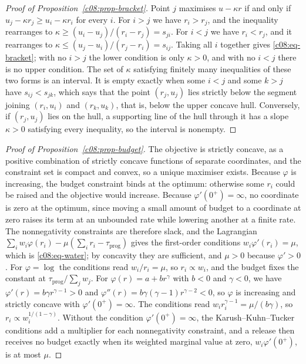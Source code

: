 \begin{proof}[Proof of Proposition~\ref{c08:prop-bracket}]
Point $j$ maximises $u - \kappa r$ if and only if $u_j - \kappa r_j \ge u_i -
\kappa r_i$ for every $i$. For $i > j$ we have $r_i > r_j$, and the inequality
rearranges to $\kappa \ge (u_i - u_j)/(r_i - r_j) = s_{ji}$. For $i < j$ we have
$r_i < r_j$, and it rearranges to $\kappa \le (u_j - u_i)/(r_j - r_i) = s_{ij}$.
Taking all $i$ together gives \eqref{c08:eq-bracket}; with no $i > j$ the lower
condition is only $\kappa > 0$, and with no $i < j$ there is no upper condition. The
set of $\kappa$ satisfying finitely many inequalities of these two forms is an
interval. It is empty exactly when some $i < j$ and some $k > j$ have
$s_{ij} < s_{jk}$, which says that the point $(r_j, u_j)$ lies strictly below the
segment joining $(r_i, u_i)$ and $(r_k, u_k)$, that is, below the upper concave hull.
Conversely, if $(r_j,u_j)$ lies on the hull, a supporting line of the hull through
it has a slope $\kappa > 0$ satisfying every inequality, so the interval is
nonempty.
\end{proof}

\begin{proof}[Proof of Proposition~\ref{c08:prop-budget}]
The objective is strictly concave, as a positive combination of strictly concave
functions of separate coordinates, and the constraint set is compact and convex, so
a unique maximiser exists. Because $\varphi$ is increasing, the budget constraint
binds at the optimum: otherwise some $r_i$ could be raised and the objective would
increase. Because $\varphi'(0^+) = \infty$, no coordinate is zero at the optimum,
since moving a small amount of budget to a coordinate at zero raises its term at an
unbounded rate while lowering another at a finite rate. The nonnegativity
constraints are therefore slack, and the Lagrangian
$\sum_i w_i\varphi(r_i) - \mu(\sum_i r_i - \tau_{\mathrm{prog}})$ gives the
first-order conditions $w_i\varphi'(r_i) = \mu$, which is \eqref{c08:eq-water}; by
concavity they are sufficient, and $\mu > 0$ because $\varphi' > 0$. For
$\varphi = \log$ the conditions read $w_i/r_i = \mu$, so $r_i \propto w_i$, and the
budget fixes the constant at $\tau_{\mathrm{prog}}/\sum_j w_j$. For
$\varphi(r) = a + b r^{\gamma}$ with $b < 0$ and $\gamma < 0$, we have
$\varphi'(r) = b\gamma r^{\gamma - 1} > 0$ and $\varphi''(r) = b\gamma(\gamma-1)
r^{\gamma-2} < 0$, so $\varphi$ is increasing and strictly concave with
$\varphi'(0^+) = \infty$. The conditions read $w_i r_i^{\gamma - 1} = \mu/(b\gamma)$,
so $r_i \propto w_i^{1/(1-\gamma)}$. Without the condition $\varphi'(0^+) = \infty$,
the Karush--Kuhn--Tucker conditions \citep{boyd2004} add a multiplier for each
nonnegativity constraint, and a release then receives no budget exactly when its
weighted marginal value at zero, $w_i \varphi'(0^+)$, is at most $\mu$.
\end{proof}
